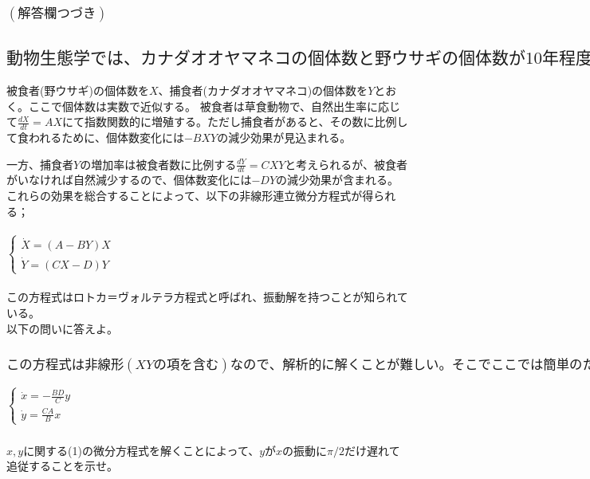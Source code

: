 \documentclass[a4paper,11pt,fleqn]{jarticle}
\begin{document}
\newpage
\subsubsection*{$(解答欄つづき)$}

\newpage
\subsection{$動物生態学では、カナダオオヤマネコの個体数と野ウサギの個体数が10年程度の時間で振動することが知られている。以下、このダイナミクスを簡単なモデルで数理化することを考える。$}
被食者(野ウサギ)の個体数を$X$、捕食者(カナダオオヤマネコ)の個体数を$Y$とおく。ここで個体数は実数で近似する。
被食者は草食動物で、自然出生率に応じて$\frac{dX}{dt}=AX$にて指数関数的に増殖する。ただし捕食者があると、その数に比例して食われるために、個体数変化には$-BXY$の減少効果が見込まれる。\par
一方、捕食者$Y$の増加率は被食者数に比例する$\frac{dY}{dt}=CXY$と考えられるが、被食者がいなければ自然減少するので、個体数変化には$-DY$の減少効果が含まれる。これらの効果を総合することによって、以下の非線形連立微分方程式が得られる；\\
\\
$\left\{ \begin{array}{l}
\dot{X}=(A-BY)X \\
\dot{Y}=(CX-D)Y
\end{array} \right.$
\\
\\
この方程式はロトカ＝ヴォルテラ方程式と呼ばれ、振動解を持つことが知られている。\\
以下の問いに答えよ。

\subsubsection{$この方程式は非線形(XYの項を含む)なので、解析的に解くことが難しい。そこでここでは簡単のため、\dot{X}=\dot{Y}=0を満たす不動点(X,Y)=(D/C,A/B)からのずれ(x,y)=(X-D/C,Y-A/B)を考えることにする。|x|,|y|が小さいとして\mathcal{O}(xy)の項を無視することにより、以下の線形連立微分方程式を導出せよ。$}
$\left\{ \begin{array}{l}
\dot{x}=-\frac{BD}{C}y \\
\dot{y}=\frac{CA}{B}x
\end{array} \right.$

\newpage
\subsubsection{}
$x,y$に関する(1)の微分方程式を解くことによって、$y$が$x$の振動に$\pi /2$だけ遅れて追従することを示せ。
\end{document}
